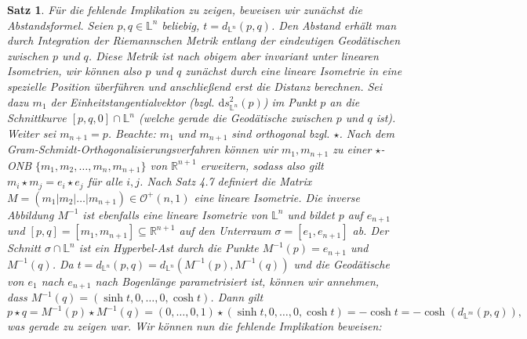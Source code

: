 \documentclass[11pt]{book}
\numberwithin{dummy}{section}
\newtheorem{theorem}{Satz}[section]
\theoremstyle{nonumberbreak}
\newenvironment{pr}[1][]{\ifthenelse{\equal{#1}{}}{\proof}{\proof[#1]}\rm}{\endproof}
\newcommand{\Loid}{\mathbb{L}}
\newcommand{\R}{\mathbb{R}}
\begin{document}
\begin{spacing}{1.4}
\begin{theorem}
\begin{pr}
Für die fehlende Implikation zu zeigen, beweisen wir zunächst die Abstandsformel. Seien $p,q \in \Loid^n$ beliebig, $t= d_{\Loid^n}(p,q)$. Den Abstand erhält man durch Integration der Riemannschen Metrik entlang der eindeutigen Geodätischen zwischen $p$ und $q$. Diese Metrik ist nach obigem aber invariant unter linearen Isometrien, wir können also $p$ und $q$ zunächst durch eine lineare Isometrie in eine spezielle Position überführen und anschließend erst die Distanz berechnen. Sei dazu $m_1$ der Einheitstangentialvektor (bzgl. $\mathrm{d}s_{\Loid^n}^2(p)$) im Punkt $p$ an die Schnittkurve $[p,q,0] \cap \Loid^n$ (welche gerade die Geodätische zwischen $p$ und $q$ ist). Weiter sei $m_{n+1}=p$. Beachte: $m_1$ und $m_{n+1}$ sind orthogonal bzgl. $\star$. Nach dem Gram-Schmidt-Orthogonalisierungsverfahren können wir $m_1, m_{n+1}$ zu einer $\star$-ONB $\{m_1, m_2, \ldots, m_n, m_{n+1}\}$ von $\R^{n+1}$ erweitern, sodass also gilt $m_i \star m_j = e_i \star e_j$ für alle $i,j$. Nach Satz 4.7 definiert die Matrix $M=(m_1 \vert m_2 \vert \ldots \vert m_{n+1}) \in \mathcal{O}^+(n,1)$ eine lineare Isometrie. Die inverse Abbildung $M^{-1}$ ist ebenfalls eine lineare Isometrie von $\Loid^n$ und bildet $p$ auf $e_{n+1}$ und $[p,q]=[m_1, m_{n+1}] \subseteq \R^{n+1}$ auf den Unterraum $\sigma = [e_1, e_{n+1}]$ ab. Der Schnitt $\sigma \cap \Loid^n$ ist ein Hyperbel-Ast durch die Punkte $M^{-1}(p)=e_{n+1}$ und $M^{-1}(q)$. Da $t= d_{\Loid^n}(p,q) = d_{\Loid^n}(M^{-1}(p), M^{-1}(q))$ und die Geodätische von $e_1$ nach $e_{n+1}$ nach Bogenlänge parametrisiert ist, können wir annehmen, dass $M^{-1}(q) =( \sinh t, 0, \ldots, 0, \cosh t)$. Dann gilt 
$$p \star q = M^{-1}(p) \star M^{-1}(q) =  (0,\ldots, 0,1) \star (\sinh t, 0 ,\ldots, 0 , \cosh t) = - \cosh t = - \cosh \left( d_{\Loid^m}(p,q)\right),$$
was gerade zu zeigen war. Wir können nun die fehlende Implikation beweisen:


\end{pr}
\end{theorem}
\end{spacing}
\end{document}
